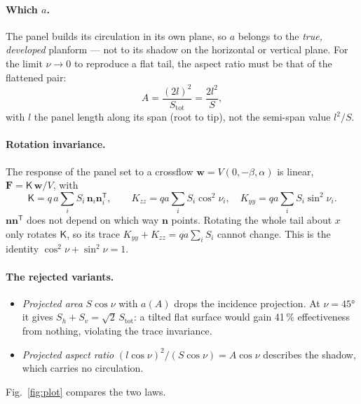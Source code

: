 \documentclass[11pt,a4paper]{article}
\newcommand{\vect}[1]{\mathbf{#1}}
\begin{document}
\paragraph{Which $a$.} The panel builds its circulation in its own plane, so $a$ belongs to the
\emph{true, developed} planform --- not to its shadow on the horizontal or vertical plane. For the
limit $\nu\to0$ to reproduce a flat tail, the aspect ratio must be that of the flattened pair:
\begin{equation}
  A = \frac{(2l)^2}{S_\mathrm{tot}} = \frac{2l^2}{S}, \label{eq:AR}
\end{equation}
with $l$ the panel length along its span (root to tip), not the semi-span value $l^2/S$.

\paragraph{Rotation invariance.} The response of the panel set to a crossflow
$\vect{w} = V(0,-\beta,\alpha)$ is linear, $\vect{F} = \mathsf{K}\,\vect{w}/V$, with
\begin{equation}
  \mathsf{K} = q\,a\sum_i S_i\,\vect{n}_i\vect{n}_i^{\mathsf{T}},\qquad
  K_{zz} = qa\sum_i S_i\cos^2\nu_i,\quad K_{yy} = qa\sum_i S_i\sin^2\nu_i. \label{eq:K}
\end{equation}
$\vect{n}\vect{n}^{\mathsf T}$ does not depend on which way $\vect{n}$ points. Rotating the whole
tail about $x$ only rotates $\mathsf K$, so its trace $K_{yy}+K_{zz}=qa\sum_i S_i$ cannot change.
This is the identity $\cos^2\nu+\sin^2\nu=1$.

\paragraph{The rejected variants.}
\begin{itemize}
  \item \emph{Projected area} $S\cos\nu$ with $a(A)$ drops the incidence projection. At
        $\nu=\ang{45}$ it gives $S_h+S_v=\sqrt2\,S_\mathrm{tot}$: a tilted flat surface would gain
        41\,\% effectiveness from nothing, violating the trace invariance.
  \item \emph{Projected aspect ratio} $(l\cos\nu)^2/(S\cos\nu)=A\cos\nu$ describes the shadow,
        which carries no circulation.
\end{itemize}
Fig.~\ref{fig:plot} compares the two laws.
\end{document}
